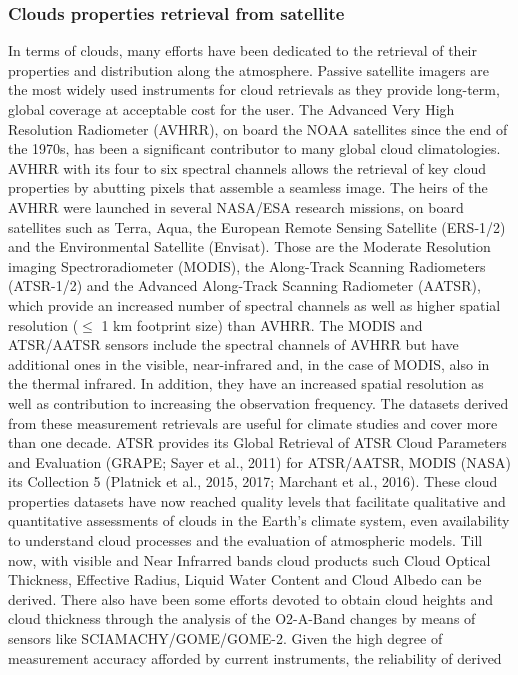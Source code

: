 \documentclass{scrartcl}
\begin{document}
\subsubsection{Clouds properties retrieval from satellite}
In terms of clouds, many efforts have been dedicated to the retrieval of their properties and distribution along the atmosphere. Passive satellite imagers are the most widely used instruments for cloud retrievals as they provide long-term, global coverage at acceptable cost for the user. 
The Advanced Very High Resolution Radiometer (AVHRR), on board the
NOAA satellites since the end of the 1970s, has been a significant contributor
to many global cloud climatologies. AVHRR with its four to six spectral channels
allows the retrieval of key cloud properties by abutting pixels that assemble a
seamless image. The heirs of the AVHRR were launched in several NASA/ESA
research missions, on board satellites such as Terra, Aqua, the European Remote
Sensing Satellite (ERS-1/2) and the Environmental Satellite (Envisat). Those are
the Moderate Resolution imaging Spectroradiometer (MODIS), the Along-Track
Scanning Radiometers (ATSR-1/2) and the Advanced Along-Track Scanning Radiometer
(AATSR), which provide an increased number of spectral channels as well as
higher spatial resolution ($\leq$ 1 km footprint size) than AVHRR. The MODIS and
ATSR/AATSR sensors include the spectral channels of AVHRR but have additional
ones in the visible, near-infrared and, in the case of MODIS, also in the
thermal infrared. In addition, they have an increased spatial resolution as well
as contribution to increasing the observation frequency. The datasets derived
from these measurement retrievals are useful for climate studies and cover more
than one decade. ATSR provides its Global Retrieval of ATSR Cloud Parameters and
Evaluation (GRAPE; Sayer et al., 2011) for ATSR/AATSR, MODIS (NASA) its
Collection 5 (Platnick et al., 2015, 2017; Marchant et al., 2016). These cloud
properties datasets have now reached quality levels that facilitate qualitative
and quantitative assessments of clouds in the Earth’s climate system, even
availability to understand cloud processes and the evaluation of atmospheric
models. Till now, with visible and Near Infrarred bands cloud products such
Cloud Optical Thickness, Effective Radius, Liquid Water Content and Cloud Albedo
can be derived. There also have been some efforts devoted to obtain cloud
heights and cloud thickness through the analysis of the O2-A-Band changes by
means of sensors like SCIAMACHY/GOME/GOME-2. Given the high degree of
measurement accuracy afforded by current instruments, the reliability of derived
\end{document}
